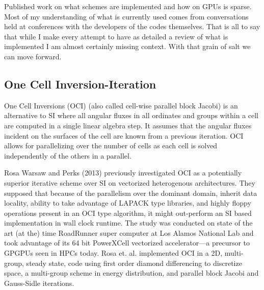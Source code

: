 Published work on what schemes are implemented and how on GPUs is sparse.
Most of my understanding of what is currently used comes from conversations held at conferences with the developers of the codes themselves.
That is all to say that while I make every attempt to have as detailed a review of what is implemented I am almost certainly missing context.
With that grain of salt we can move forward.



\subsection{One Cell Inversion-Iteration}


One Cell Inversions (OCI) (also called cell-wise parallel block Jacobi) is an alternative to SI where all angular fluxes in all ordinates and groups within a cell are computed in a single linear algebra step.
It assumes that the angular fluxes incident on the surfaces of the cell are known from a previous iteration.
OCI allows for parallelizing over the number of cells as each cell is solved independently of the others in a parallel.

Rosa Warsaw and Perks (2013) \cite{rosa_cellwise_2013} previously investigated OCI as a potentially superior iterative scheme over SI on vectorized heterogenous architectures.
They supposed that because of the parallelism over the dominant domain, inherit data locality, ability to take advantage of LAPACK type libraries, and highly floppy operations present in an OCI type algorithm, it might out-perform an SI based implementation in wall clock runtime.
The study was conducted on state of the art (at the) time RoadRunner super computer at Los Alamos National Lab and took advantage of its 64 bit PowerXCell vectorized accelerator---a precursor to GPGPUs seen in HPCs today.
Rosa et. al. implemented OCI in a 2D, multi-group, steady state, code using first order diamond differencing to discretize space, a multi-group scheme in energy distribution, and parallel block Jacobi and Gauss-Sidle iterations.

